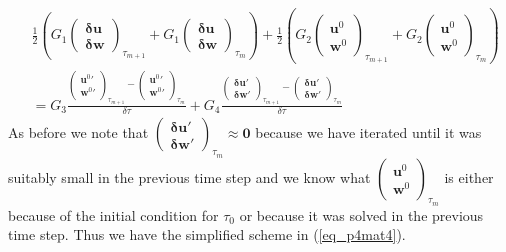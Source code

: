 \documentclass[11pt,fleqn]{article}
\theoremstyle{defstyle}
\begin{document}
\begin{equation}
\begin{aligned}
&\frac{1}{2} \left(G_1 \begin{pmatrix}
\mathbf{\delta u} \\ \mathbf{\delta w} 
\end{pmatrix}_{\tau_{m+1}} + G_1 \begin{pmatrix}
\mathbf{\delta u} \\ \mathbf{\delta w} 
\end{pmatrix}_{\tau_{m}}\right) +\frac{1}{2} \left(G_2 \begin{pmatrix}
\mathbf{u}^0 \\ \mathbf{w}^0 
\end{pmatrix}_{\tau_{m+1}} + G_2 \begin{pmatrix}
\mathbf{u}^0 \\ \mathbf{w}^0 
\end{pmatrix}_{\tau_{m}}\right)
\\ &= G_3 \frac{\begin{pmatrix}
\mathbf{u}^0\prime \\ \mathbf{w}^0\prime 
\end{pmatrix}_{\tau_{m+1}} - \begin{pmatrix}
\mathbf{u}^0\prime \\ \mathbf{w}^0\prime 
\end{pmatrix}_{\tau_{m}}}{\delta \tau} + G_4 \frac{\begin{pmatrix}
\mathbf{\delta u}\prime \\ \mathbf{\delta w}\prime 
\end{pmatrix}_{\tau_{m+1}} - \begin{pmatrix}
\mathbf{\delta u}\prime \\ \mathbf{\delta w}\prime 
\end{pmatrix}_{\tau_{m}}}{\delta \tau} 
\end{aligned}
\label{eq_p4mat3}
\end{equation}
As before we note that $\begin{pmatrix}
\mathbf{\delta u}\prime \\ \mathbf{\delta w}\prime 
\end{pmatrix}_{\tau_{m}} \approx \mathbf{0}$ because we have iterated until it was suitably small in the previous time step and we know what $\begin{pmatrix}
\mathbf{u}^0 \\ \mathbf{w}^0 \end{pmatrix}_{\tau_{m}}$ is either because of the initial condition for $\tau_0$ or because it was solved in the previous time step. Thus we have the simplified scheme in (\ref{eq_p4mat4}).
\end{document}

